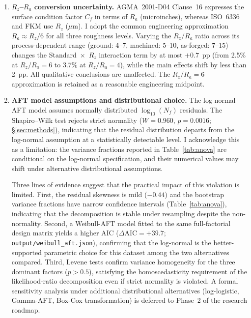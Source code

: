 \documentclass[12pt,a4paper]{article}
\begin{document}
\begin{enumerate}
        it reflects the standard's stated validity range; extrapolating
        beyond $R_z = 40~\mu$m would exceed the ISO specification.
  \item \textbf{$R_z$--$R_a$ conversion uncertainty.} AGMA~2001-D04
        Clause~16 expresses the surface condition factor $C_f$ in terms
        of $R_a$ (microinches), whereas ISO~6336 and FKM use $R_z$
        ($\mu$m). I adopt the common engineering approximation
        $R_a \approx R_z/6$ for all three roughness levels. Varying the
        $R_z/R_a$ ratio across its process-dependent range (ground: 4--7,
        machined: 5--10, as-forged: 7--15) changes the
        Standard~$\times$~$R_z$ interaction term by at most $+0.7$~pp
        (from 2.5\% at $R_z/R_a=6$ to 3.7\% at $R_z/R_a=4$), while the
        main effects shift by less than 2~pp. All qualitative
        conclusions are unaffected. The $R_z/R_a=6$ approximation is
        retained as a reasonable engineering midpoint.
  \item \textbf{AFT model assumptions and distributional choice.} The
        log-normal AFT model assumes normally distributed
        $\log_{10}(N_f)$ residuals. The Shapiro--Wilk test rejects
        strict normality ($W=0.960$, $p=0.0016$; \S\ref{sec:methods}),
        indicating that the residual distribution departs from the
        log-normal assumption at a statistically detectable level.
        I acknowledge this as a limitation: the variance fractions
        reported in Table~\ref{tab:anova} are conditional on the
        log-normal specification, and their numerical values may shift
        under alternative distributional assumptions.

        Three lines of evidence suggest that the practical impact of this
        violation is limited. First, the residual skewness is mild
        ($-0.44$) and the bootstrap variance fractions have narrow
        confidence intervals (Table~\ref{tab:anova}), indicating that the
        decomposition is stable under resampling despite the non-normality.
        Second, a Weibull-AFT model fitted to the same full-factorial
        design matrix yields a higher AIC ($\Delta\mathrm{AIC} = +39.7$;
        \texttt{output/weibull\_aft.json}), confirming that the
        log-normal is the better-supported parametric choice for this
        dataset among the two alternatives compared. Third, Levene tests
        confirm variance homogeneity for the three dominant factors
        ($p > 0.5$), satisfying the homoscedasticity requirement of the
        likelihood-ratio decomposition even if strict normality is
        violated. A formal sensitivity analysis under additional
        distributional alternatives (log-logistic, Gamma-AFT, Box-Cox
        transformation) is deferred to Phase~2 of the research roadmap.


\end{enumerate}
\end{document}
